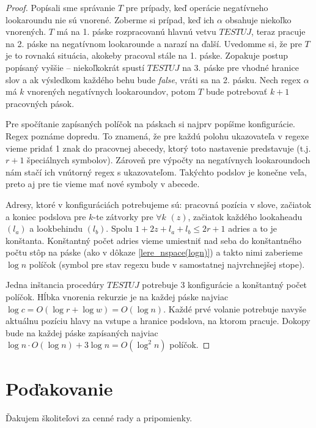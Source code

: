 \documentclass{svk_long_sk}
\begin{document}
\begin{proof}
Popísali sme správanie $T$ pre prípady, keď operácie negatívneho lookaroundu nie sú vnorené. Zoberme si prípad, keď ich $\alpha$ obsahuje niekoľko vnorených. $T$ má na 1. páske rozpracovanú hlavnú vetvu $TESTUJ$, teraz pracuje na 2. páske na negatívnom lookarounde a narazí na ďalší. Uvedomme si, že pre $T$ je to rovnaká situácia, akokeby pracoval stále na 1. páske. Zopakuje postup popísaný vyššie -- niekoľkokrát spustí $TESTUJ$ na 3. páske pre vhodné hranice slov a ak výsledkom každého behu bude \textit{false}, vráti sa na 2. pásku. Nech regex $\alpha$ má $k$ vnorených negatívnych lookaroundov, potom $T$ bude potrebovať $k+1$ pracovných pások.

Pre spočítanie zapísaných políčok na páskach si najprv popíšme konfigurácie. Regex poznáme dopredu. To znamená, že pre každú polohu ukazovateľa v regexe vieme pridať 1 znak do pracovnej abecedy, ktorý toto nastavenie predstavuje (t.j. $r+1$ špeciálnych symbolov). Zároveň pre výpočty na negatívnych lookaroundoch nám stačí ich vnútorný regex s ukazovateľom. Takýchto podslov je konečne veľa, preto aj pre tie vieme mať nové symboly v abecede. 

Adresy, ktoré v konfiguráciách potrebujeme sú: pracovná pozícia v slove, začiatok a koniec podslova pre $k$-te zátvorky pre $\forall k$ $(z)$, začiatok každého lookaheadu $(l_a)$ a lookbehindu $(l_b)$. Spolu $1+2z+l_a+l_b \leq 2r+1$ adries a to je konštanta. Konštantný počet adries vieme umiestniť nad seba do konštantného počtu stôp na páske (ako v dôkaze \ref{lere_nspace(logn)}) a takto nimi zaberieme $\log n$ políčok (symbol pre stav regexu bude v samostatnej najvrchnejšej stope).

Jedna inštancia procedúry $TESTUJ$ potrebuje 3 konfigurácie a konštantný počet políčok. Hĺbka vnorenia rekurzie je na každej páske najviac $\log c=O(\log r + \log w) = O(\log n)$. Každé prvé volanie potrebuje navyše aktuálnu pozíciu hlavy na vstupe a hranice podslova, na ktorom pracuje. Dokopy bude na každej páske zapísaných najviac $\log n \cdot O(\log n) + 3\log n = O(\log^2n)$ políčok.
\end{proof}


\section*{Poďakovanie}
Ďakujem školiteľovi za cenné rady a pripomienky.


\nocite{*}


\end{document}
